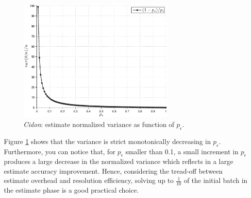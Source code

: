 \documentclass[11pt,a4paper,twoside,openright]{book}
\newcommand{\pc}{p_{\epsilon}}
\begin{document}
\begin{figure}[htbp]
\begin{center}
\includegraphics[width=0.7\textwidth]{matlab/Cidon/cidon-variance-p}
\caption[\emph{Cidon}: Normalized variance]{\emph{Cidon}:  estimate normalized variance as function of $\pc$.}
\label{fig:cidon-normalized-variance}
\end{center}
\end{figure}

Figure \ref{fig:cidon-normalized-variance} shows that the variance is strict monotonically decreasing in $\pc$. Furthermore, you can notice that, for $\pc$ smaller than 0.1, a small increment in $\pc$ produces a large decrease in the normalized variance which reflects in a large estimate accuracy improvement. Hence, considering the tread-off between estimate overhead and resolution efficiency, solving up to $\frac{1}{10}$ of the initial batch in the estimate phase is a good practical choice.\\
\end{document}
